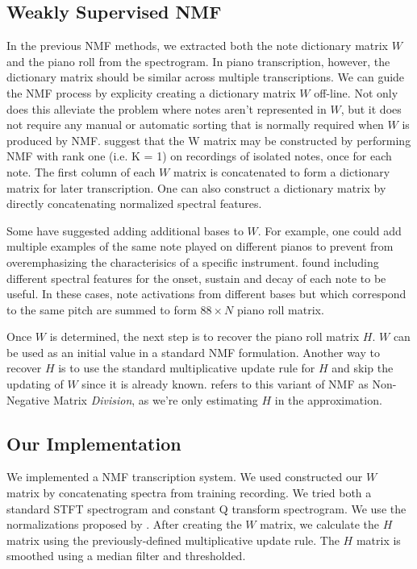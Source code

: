 \documentclass[5p]{elsarticle}
\begin{document}
\subsection{Weakly Supervised NMF}

In the previous NMF methods, we extracted both the note dictionary matrix $W$ and the piano roll from the spectrogram. In piano transcription, however, the dictionary matrix should be similar across multiple transcriptions. We can guide the NMF process by explicity creating a dictionary matrix $W$ off-line. Not only does this alleviate the problem where notes aren't represented in $W$, but it does not require any manual or automatic sorting that is normally required when $W$ is produced by NMF. \citet{weninger2013discriminative} suggest that the W matrix may be constructed by performing NMF with rank one (i.e. K = 1) on recordings of isolated notes, once for each note. The first column of each $W$ matrix is concatenated to form a dictionary matrix for later transcription. One can also construct a dictionary matrix by directly concatenating normalized spectral features\cite{niedermayer2008non}.

Some have suggested adding additional bases to $W$. For example, one could add multiple examples of the same note played on different pianos to prevent from overemphasizing the characterisics of a specific instrument. \citet{weninger2013discriminative} found including different spectral features for the onset, sustain and decay of each note to be useful. In these cases, note activations from different bases but which correspond to the same pitch are summed to form $88 \times N$ piano roll matrix.

Once $W$ is determined, the next step is to recover the piano roll matrix $H$. $W$ can be used as an initial value in a standard NMF formulation. Another way to recover $H$ is to use the standard multiplicative update rule for $H$ and skip the updating of $W$ since it is already known. \citet{niedermayer2008non} refers to this variant of NMF as Non-Negative Matrix \textit{Division}, as we're only estimating $H$ in the approximation.

\subsection{Our Implementation}

We implemented a NMF transcription system. We used constructed our $W$ matrix by concatenating spectra from training recording. We tried both a standard STFT spectrogram and constant Q transform spectrogram. We use the normalizations proposed by \citet{niedermayer2008non}. After creating the $W$ matrix, we calculate the $H$ matrix using the previously-defined multiplicative update rule. The $H$ matrix is smoothed using a median filter and thresholded. 
\end{document}
